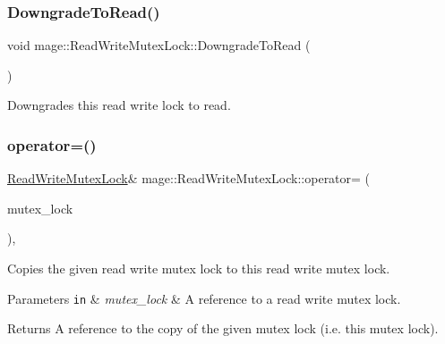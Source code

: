 \subsubsection{\texorpdfstring{Downgrade\+To\+Read()}{DowngradeToRead()}}
{\footnotesize\ttfamily void mage\+::\+Read\+Write\+Mutex\+Lock\+::\+Downgrade\+To\+Read (\begin{DoxyParamCaption}{ }\end{DoxyParamCaption})}

Downgrades this read write lock to read. \hypertarget{structmage_1_1_read_write_mutex_lock_ade82a57f337e39a1515f67fbc1f6fc43}{}\label{structmage_1_1_read_write_mutex_lock_ade82a57f337e39a1515f67fbc1f6fc43} 
\subsubsection{\texorpdfstring{operator=()}{operator=()}\hspace{0.1cm}{\footnotesize\ttfamily [1/2]}}
{\footnotesize\ttfamily \hyperlink{structmage_1_1_read_write_mutex_lock}{Read\+Write\+Mutex\+Lock}\& mage\+::\+Read\+Write\+Mutex\+Lock\+::operator= (\begin{DoxyParamCaption}\item[{const \hyperlink{structmage_1_1_read_write_mutex_lock}{Read\+Write\+Mutex\+Lock} \&}]{mutex\+\_\+lock }\end{DoxyParamCaption})\hspace{0.3cm}{\ttfamily [private]}, {\ttfamily [delete]}}

Copies the given read write mutex lock to this read write mutex lock.


\begin{DoxyParams}[1]{Parameters}
\mbox{\tt in}  & {\em mutex\+\_\+lock} & A reference to a read write mutex lock. \\
\hline
\end{DoxyParams}
\begin{DoxyReturn}{Returns}
A reference to the copy of the given mutex lock (i.\+e. this mutex lock). 
\end{DoxyReturn}
\hypertarget{structmage_1_1_read_write_mutex_lock_a0c31334330a9259b0b68d71b9ee13704}{}\label{structmage_1_1_read_write_mutex_lock_a0c31334330a9259b0b68d71b9ee13704} 
